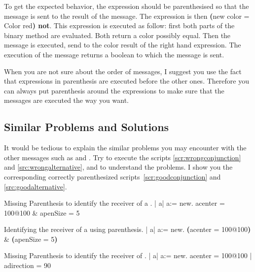 To get the expected behavior, the expression should be parenthesised so that the  message is sent to the result of the \ct{=} message. The expression is then \textbf{(}\Turtle new  color = Color red\textbf{) not}. This expression is executed as follow: first both parts of the binary method \ct{=} are evaluated. Both return a color possibly equal. Then the \ct{=} message is executed, \ie send to the color result of the right hand expression. The execution of the message \ct{=} returns a boolean to which the message  is sent. 

When you are not sure about the order of messages, I suggest you use the fact that expressions in parenthesis are executed before the other ones. Therefore you can always put parenthesis around the expressions to make sure that the messages are executed the way you want. 

\subsection*{Similar Problems and Solutions}

It would be tedious to explain the similar problems you may encounter with the other messages such as \ct{\&} and \ct{$\mid$}. Try to execute the scripts \ref{scr:wrongconjunction} and \ref{src:wrongalternative},  and to understand the problems. I show you the corresponding correctly parenthesized scripts~\ref{scr:goodconjunction} and \ref{src:goodalternative}. 

\begin{scriptwithtitle}{Missing Parenthesis to identify the receiver of a \ct{\&}.}\label{scr:wrongconjunction}
| a\Turtle |
a\Turtle := \Turtle new.
a\Turtle center = 100@100 & a\Turtle penSize = 5
\end{scriptwithtitle}

\begin{scriptwithtitle}{Identifying the receiver of a \ct{\&} using parenthesis.}\label{scr:goodconjunction}
| a\Turtle |
a\Turtle := \Turtle new.
\textbf{(}a\Turtle center = 100@100\textbf{)} & \textbf{(}a\Turtle penSize = 5\textbf{)}
\end{scriptwithtitle}


\begin{scriptwithtitle}{Missing Parenthesis to identify the receiver of \ct{$\mid$}.}\label{src:wrongalternative}
| a\Turtle |
a\Turtle := \Turtle new.
a\Turtle center = 100@100 | a\Turtle direction = 90
\end{scriptwithtitle}


